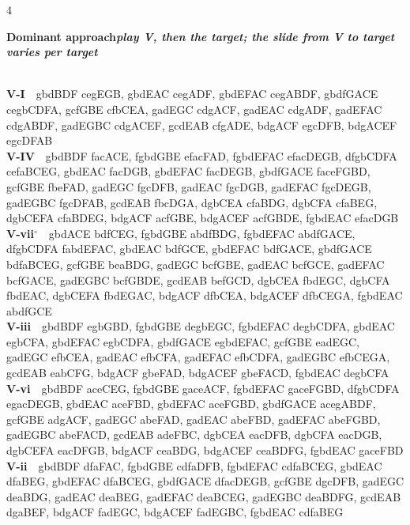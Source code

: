 \documentclass[letterpaper,12pt]{article}
\begin{document}
\begin{multicols}{4}
\noindent\colorbox{hdr5}{\begin{minipage}{\dimexpr\linewidth-2\fboxsep\relax}\raggedright\color{white}\bfseries Dominant approach\quad\normalfont\itshape play V, then the target; the slide from V to target varies per target\end{minipage}}\\[0.1mm]
\noindent\hangindent=0.25in {\color{lhcol}\bfseries V-I}~~{\ttfamily gbdBDF cegEGB, gbdEAC cegADF, gbdEFAC cegABDF, gbdfGACE cegbCDFA, gcfGBE cfbCEA, gadEGC cdgACF, gadEAC cdgADF, gadEFAC cdgABDF, gadEGBC cdgACEF, gcdEAB cfgADE, bdgACF egcDFB, bdgACEF egcDFAB}\\[0.1mm]
\noindent\hangindent=0.25in {\color{lhcol}\bfseries V-IV}~~{\ttfamily gbdBDF facACE, fgbdGBE efacFAD, fgbdEFAC efacDEGB, dfgbCDFA cefaBCEG, gbdEAC facDGB, gbdEFAC facDEGB, gbdfGACE faceFGBD, gcfGBE fbeFAD, gadEGC fgcDFB, gadEAC fgcDGB, gadEFAC fgcDEGB, gadEGBC fgcDFAB, gcdEAB fbcDGA, dgbCEA cfaBDG, dgbCFA cfaBEG, dgbCEFA cfaBDEG, bdgACF acfGBE, bdgACEF acfGBDE, fgbdEAC efacDGB}\\[0.1mm]
\noindent\hangindent=0.25in {\color{lhcol}\bfseries V-vii$^\circ$}~~{\ttfamily gbdACE bdfCEG, fgbdGBE abdfBDG, fgbdEFAC abdfGACE, dfgbCDFA fabdEFAC, gbdEAC bdfGCE, gbdEFAC bdfGACE, gbdfGACE bdfaBCEG, gcfGBE beaBDG, gadEGC bcfGBE, gadEAC bcfGCE, gadEFAC bcfGACE, gadEGBC bcfGBDE, gcdEAB befGCD, dgbCEA fbdEGC, dgbCFA fbdEAC, dgbCEFA fbdEGAC, bdgACF dfbCEA, bdgACEF dfbCEGA, fgbdEAC abdfGCE}\\[0.1mm]
\noindent\hangindent=0.25in {\color{lhcol}\bfseries V-iii}~~{\ttfamily gbdBDF egbGBD, fgbdGBE degbEGC, fgbdEFAC degbCDFA, gbdEAC egbCFA, gbdEFAC egbCDFA, gbdfGACE egbdEFAC, gcfGBE eadEGC, gadEGC efbCEA, gadEAC efbCFA, gadEFAC efbCDFA, gadEGBC efbCEGA, gcdEAB eabCFG, bdgACF gbeFAD, bdgACEF gbeFACD, fgbdEAC degbCFA}\\[0.1mm]
\noindent\hangindent=0.25in {\color{lhcol}\bfseries V-vi}~~{\ttfamily gbdBDF aceCEG, fgbdGBE gaceACF, fgbdEFAC gaceFGBD, dfgbCDFA egacDEGB, gbdEAC aceFBD, gbdEFAC aceFGBD, gbdfGACE acegABDF, gcfGBE adgACF, gadEGC abeFAD, gadEAC abeFBD, gadEFAC abeFGBD, gadEGBC abeFACD, gcdEAB adeFBC, dgbCEA eacDFB, dgbCFA eacDGB, dgbCEFA eacDFGB, bdgACF ceaBDG, bdgACEF ceaBDFG, fgbdEAC gaceFBD}\\[0.1mm]
\noindent\hangindent=0.25in {\color{lhcol}\bfseries V-ii}~~{\ttfamily gbdBDF dfaFAC, fgbdGBE cdfaDFB, fgbdEFAC cdfaBCEG, gbdEAC dfaBEG, gbdEFAC dfaBCEG, gbdfGACE dfacDEGB, gcfGBE dgcDFB, gadEGC deaBDG, gadEAC deaBEG, gadEFAC deaBCEG, gadEGBC deaBDFG, gcdEAB dgaBEF, bdgACF fadEGC, bdgACEF fadEGBC, fgbdEAC cdfaBEG}\\[0.1mm]
\vspace{1.5mm}


\end{multicols}
\end{document}
